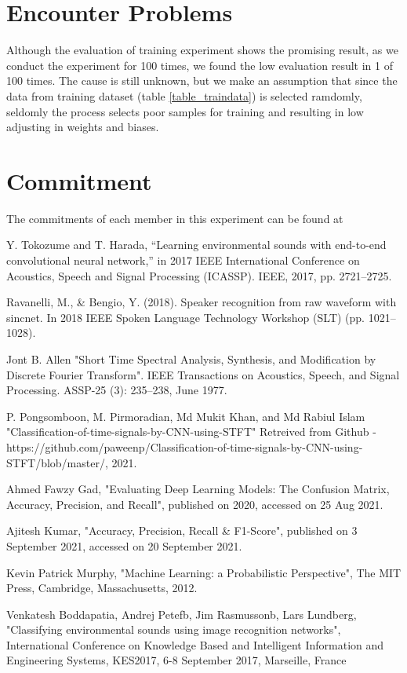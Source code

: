 \documentclass[conference]{IEEEtran}
\begin{document}
\section{Encounter Problems}
Although the evaluation of training experiment shows the promising result, as we conduct the experiment for 100 times, we found the low evaluation result in 1 of 100 times. The cause is still unknown, but we make an assumption that since the data from training dataset (table \ref{table_traindata}) is selected ramdomly, seldomly the process selects poor samples for training and resulting in low adjusting in weights and biases. 

\section{Commitment}
The commitments of each member in this experiment can be found at \cite{b4}


\begin{thebibliography}{00}
 Y. Tokozume and T. Harada, “Learning environmental sounds with end-to-end convolutional neural network,” in 2017 IEEE International Conference on Acoustics, Speech and Signal Processing (ICASSP). IEEE, 2017, pp. 2721–2725.

 Ravanelli, M., \& Bengio, Y. (2018). Speaker recognition from raw waveform with sincnet.
In 2018 IEEE Spoken Language Technology Workshop (SLT) (pp. 1021–1028).

 Jont B. Allen "Short Time Spectral Analysis, Synthesis, and Modification by Discrete Fourier Transform". IEEE Transactions on Acoustics, Speech, and Signal Processing. ASSP-25 (3): 235–238, June 1977.

 P. Pongsomboon, M. Pirmoradian, Md Mukit Khan, and Md Rabiul Islam "Classification-of-time-signals-by-CNN-using-STFT" Retreived from Github - https://github.com/paweenp/Classification-of-time-signals-by-CNN-using-STFT/blob/master/, 2021.

 Ahmed Fawzy Gad, "Evaluating Deep Learning Models: The Confusion Matrix, Accuracy, Precision, and Recall", published on 2020, accessed on 25 Aug 2021.

 Ajitesh Kumar, "Accuracy, Precision, Recall \& F1-Score", published on 3 September 2021, accessed on 20 September 2021.

 Kevin Patrick Murphy, "Machine Learning: a Probabilistic Perspective", The MIT Press, Cambridge, Massachusetts, 2012.

 Venkatesh Boddapatia, Andrej Petefb, Jim Rasmussonb, Lars Lundberg, "Classifying environmental sounds using image recognition networks", International Conference on Knowledge Based and Intelligent Information and Engineering Systems, KES2017, 6-8 September 2017, Marseille, France

\end{thebibliography}
\end{document}
